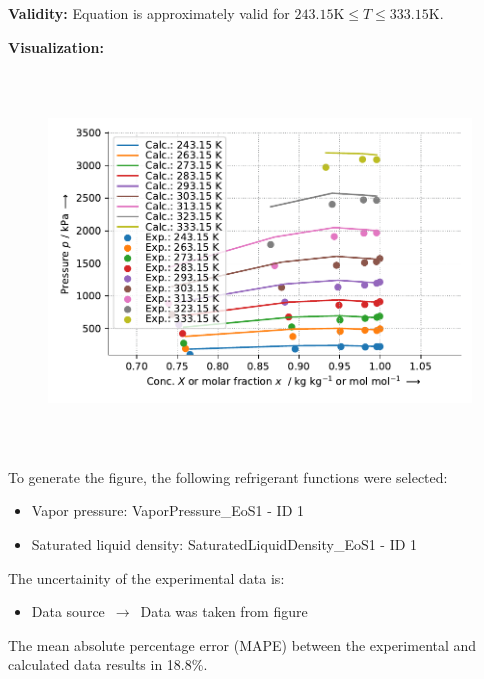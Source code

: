 \textbf{Validity:}
\newline
Equation is approximately valid for $243.15 \si{\kelvin} \leq T \leq 333.15 \si{\kelvin}$.
\newline

\textbf{Visualization:}
%
\begin{figure}[!htp]
{\noindent\includegraphics[height=10cm, keepaspectratio]{figs/abs/abs_R-125_lubricant_POE_UniquacFixedDu_1.pdf}}
\end{figure}
%

To generate the figure, the following refrigerant functions were selected:
\begin{itemize}
\item Vapor pressure: VaporPressure\_EoS1 - ID 1
\item Saturated liquid density: SaturatedLiquidDensity\_EoS1 - ID 1
\end{itemize}

The uncertainity of the experimental data is:
\begin{itemize}
\item Data source $\,\to\,$ Data was taken from figure
\end{itemize}

The mean absolute percentage error (MAPE) between the experimental and calculated data results in 18.8\%.
\FloatBarrier
\newpage
